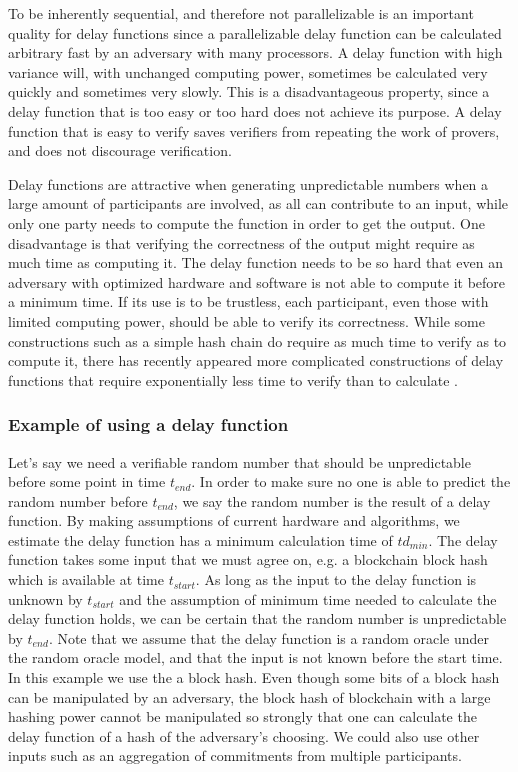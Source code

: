 To be inherently sequential, and therefore not parallelizable is an important quality for delay functions since a parallelizable delay function can be calculated arbitrary fast by an adversary with many processors. A delay function with high variance will, with unchanged computing power, sometimes be calculated very quickly and sometimes very slowly. This is a disadvantageous property, since a delay function that is too easy or too hard does not achieve its purpose. A delay function that is easy to verify saves verifiers from repeating the work of provers, and does not discourage verification.

Delay functions are attractive when generating unpredictable numbers when a large amount of participants are involved, as all can contribute to an input, while only one party needs to compute the function in order to get the output. One disadvantage is that verifying the correctness of the output might require as much time as computing it. The delay function needs to be so hard that even an adversary with optimized hardware and software is not able to compute it before a minimum time. If its use is to be trustless, each participant, even those with limited computing power, should be able to verify its correctness. While some constructions such as a simple hash chain do require as much time to verify as to compute it, there has recently appeared more complicated constructions of delay functions that require exponentially less time to verify than to calculate \cite{boneh_verifiable_2018}.

\subsubsection{Example of using a delay function}
Let's say we need a verifiable random number that should be unpredictable before some point in time $t_{end}$. In order to make sure no one is able to predict the random number before $t_{end}$, we say the random number is the result of a delay function. By making assumptions of current hardware and algorithms, we estimate the delay function has a minimum calculation time of $td_{min}$. The delay function takes some input that we must agree on, e.g. a blockchain block hash which is available at time $t_{start}$. As long as the input to the delay function is unknown by $t_{start}$ and the assumption of minimum time needed to calculate the delay function holds, we can be certain that the random number is unpredictable by $t_{end}$. Note that we assume that the delay function is a random oracle under the random oracle model, and that the input is not known before the start time. In this example we use the a block hash. Even though some bits of a block hash can be manipulated by an adversary, the block hash of blockchain with a large hashing power cannot be manipulated so strongly that one can calculate the delay function of a hash of the adversary's choosing. We could also use other inputs such as an aggregation of commitments from multiple participants.


